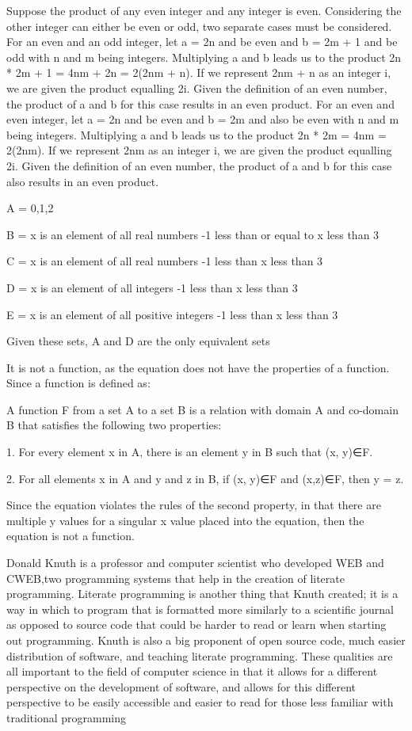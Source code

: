 \documentclass{article}
\begin{document}
\clearpage
\header
Suppose the product of any even integer and any integer is even. Considering the other integer can either be even or odd, two separate cases must be considered. For an even and an odd integer, let a = 2n and be even and b = 2m + 1 and be odd with n and m being integers. Multiplying a and b leads us to the product 2n * 2m + 1 = 4nm + 2n = 2(2nm + n). If we represent 2nm + n as an integer i, we are given the product equalling 2i. Given the definition of an even number, the product of a and b for this case results in an even product.  For an even and even integer, let a = 2n and be even and b = 2m and also be even with n and m being integers. Multiplying a and b leads us to the product 2n * 2m = 4nm = 2(2nm). If we represent 2nm as an integer i, we are given the product equalling 2i. Given the definition of an even number, the product of a and b for this case also results in an even product.


\clearpage
\header
\item A = {0,1,2}
\item B = {x is an element of all real numbers -1 less than or equal to x less than 3}
\item C = {x is an element of all real numbers -1 less than x less than 3}
\item D = {x is an element of all integers -1 less than x less than 3}
\item E = {x is an element of all positive integers -1 less than x less than 3}
\item Given these sets, A and D are the only equivalent sets

\clearpage
\header
It is not a function, as the equation does not have the properties of a function. Since a function is defined as:
\item A function F from a set A to a set B is a relation with domain A and co-domain B that satisfies the following two properties:

1. For every element x in A, there is an element y in B such that (x, y)∈F.

2. For all elements x in A and y and z in B, if (x, y)∈F and (x,z)∈F, then y = z. 
\item Since the equation violates the rules of the second property, in that there are multiple y values for a singular x value placed into the equation, then the equation is not a function.

\clearpage
\header
Donald Knuth is a professor and computer scientist who developed WEB and CWEB,two programming systems that help in the creation of literate programming. Literate programming is another thing that Knuth created; it is a way in which to program that is formatted more similarly to a scientific journal as opposed to source code that could be harder to read or learn when starting out programming. Knuth is also a big proponent of open source code, much easier distribution of software, and teaching literate programming. These qualities are all important to the field of computer science in that it allows for a different perspective on the development of software, and allows for this different perspective to be easily accessible and easier to read for those less familiar with traditional programming
\end{document}
